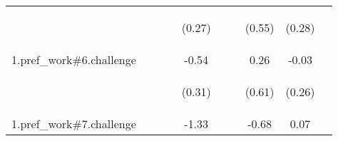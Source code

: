 \begin{center}
\begin{tabular}{lccccccccc}
 & \begin{footnotesize}\end{footnotesize} & \begin{footnotesize}\end{footnotesize} & \begin{footnotesize}\end{footnotesize} & \begin{footnotesize}(0.27)\end{footnotesize} & \begin{footnotesize}\end{footnotesize} & \begin{footnotesize}\end{footnotesize} & \begin{footnotesize}(0.55)\end{footnotesize} & \begin{footnotesize}(0.28)\end{footnotesize} & \begin{footnotesize}\end{footnotesize}\\
\noalign{\smallskip}1.pref_work\#6.challenge &  &  &  & -0.54 &  &  & 0.26 & -0.03 & \\
 & \begin{footnotesize}\end{footnotesize} & \begin{footnotesize}\end{footnotesize} & \begin{footnotesize}\end{footnotesize} & \begin{footnotesize}(0.31)\end{footnotesize} & \begin{footnotesize}\end{footnotesize} & \begin{footnotesize}\end{footnotesize} & \begin{footnotesize}(0.61)\end{footnotesize} & \begin{footnotesize}(0.26)\end{footnotesize} & \begin{footnotesize}\end{footnotesize}\\
\noalign{\smallskip}1.pref_work\#7.challenge &  &  &  & -1.33 &  &  & -0.68 & 0.07 & \\

\end{tabular}
\end{center}
